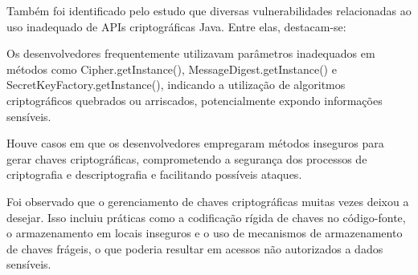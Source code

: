 
Também foi identificado pelo estudo que diversas vulnerabilidades relacionadas ao uso inadequado de APIs criptográficas Java. Entre elas, destacam-se:

Os desenvolvedores frequentemente utilizavam parâmetros inadequados em métodos como Cipher.getInstance(), MessageDigest.getInstance() e SecretKeyFactory.getInstance(), indicando a utilização de algoritmos criptográficos quebrados ou arriscados, potencialmente expondo informações sensíveis.

Houve casos em que os desenvolvedores empregaram métodos inseguros para gerar chaves criptográficas, comprometendo a segurança dos processos de criptografia e descriptografia e facilitando possíveis ataques.

Foi observado que o gerenciamento de chaves criptográficas muitas vezes deixou a desejar. Isso incluiu práticas como a codificação rígida de chaves no código-fonte, o armazenamento em locais inseguros e o uso de mecanismos de armazenamento de chaves frágeis, o que poderia resultar em acessos não autorizados a dados sensíveis.

